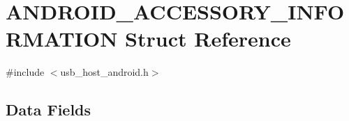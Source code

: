 \hypertarget{struct_a_n_d_r_o_i_d___a_c_c_e_s_s_o_r_y___i_n_f_o_r_m_a_t_i_o_n}{}\section{A\+N\+D\+R\+O\+I\+D\+\_\+\+A\+C\+C\+E\+S\+S\+O\+R\+Y\+\_\+\+I\+N\+F\+O\+R\+M\+A\+T\+I\+O\+N Struct Reference}
\label{struct_a_n_d_r_o_i_d___a_c_c_e_s_s_o_r_y___i_n_f_o_r_m_a_t_i_o_n}


{\ttfamily \#include $<$usb\+\_\+host\+\_\+android.\+h$>$}

\subsection*{Data Fields}
